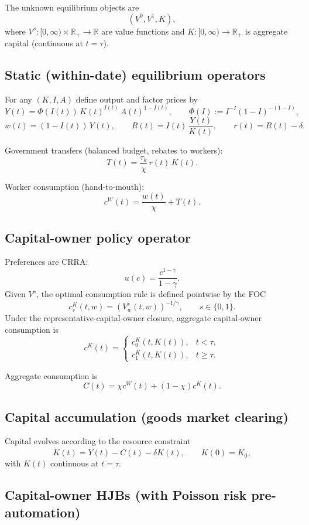 \documentclass{article}
\begin{document}
The unknown equilibrium objects are
$$
\left(V^0,V^1,K\right),
$$
where $V^s:[0,\infty)\times\mathbb{R}_+\to\mathbb{R}$ are value functions and
$K:[0,\infty)\to\mathbb{R}_+$ is aggregate capital (continuous at $t=\tau$).

\subsection*{Static (within-date) equilibrium operators}

For any $(K,I,A)$ define output and factor prices by
$$
Y(t) = \Phi(I(t))\,K(t)^{I(t)}\,A(t)^{1-I(t)},
\qquad
\Phi(I):=I^{-I}(1-I)^{-(1-I)},
$$
$$
w(t) = (1-I(t))\,Y(t),
\qquad
R(t) = I(t)\,\frac{Y(t)}{K(t)},
\qquad
r(t)=R(t)-\delta.
$$

Government transfers (balanced budget, rebates to workers):
$$
T(t) = \frac{\tau_k}{\chi}\,r(t)\,K(t).
$$

Worker consumption (hand-to-mouth):
$$
c^W(t) = \frac{w(t)}{\chi} + T(t).
$$

\subsection*{Capital-owner policy operator}

Preferences are CRRA:
$$
u(c)=\frac{c^{1-\gamma}}{1-\gamma}.
$$
Given $V^s$, the optimal consumption rule is defined pointwise by the FOC
$$
c^K_s(t,w) = \left(V^s_w(t,w)\right)^{-1/\gamma},
\qquad s\in\{0,1\}.
$$
Under the representative-capital-owner closure, aggregate capital-owner consumption is
$$
c^K(t) = 
\begin{cases}
c^K_0(t,K(t)), & t<\tau,\\
c^K_1(t,K(t)), & t\ge \tau.
\end{cases}
$$

Aggregate consumption is
$$
C(t)=\chi c^W(t) + (1-\chi)c^K(t).
$$

\subsection*{Capital accumulation (goods market clearing)}

Capital evolves according to the resource constraint
$$
\dot K(t) = Y(t) - C(t) - \delta K(t),
\qquad K(0)=K_0,
$$
with $K(t)$ continuous at $t=\tau$.

\subsection*{Capital-owner HJBs (with Poisson risk pre-automation)}
\end{document}
